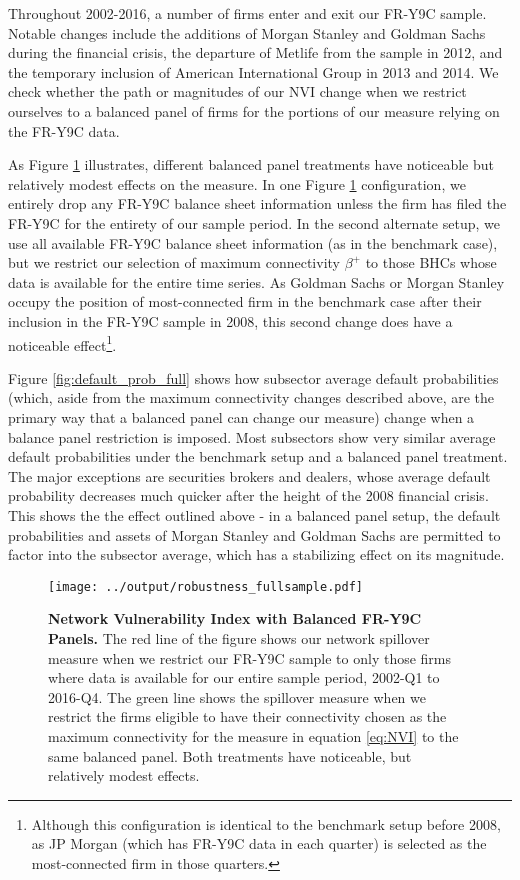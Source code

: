 Throughout 2002-2016, a number of firms enter and exit our FR-Y9C sample. Notable changes include the additions of Morgan Stanley and Goldman Sachs during the financial crisis, the departure of Metlife from the sample in 2012, and the temporary inclusion of American International Group in 2013 and 2014. We check whether the path or magnitudes of our NVI change when we restrict ourselves to a balanced panel of firms for the portions of our measure relying on the FR-Y9C data. 

As Figure \ref{fig:NVI_robust_full} illustrates, different balanced panel treatments have noticeable but relatively modest effects on the measure. In one Figure \ref{fig:NVI_robust_full} configuration, we entirely drop any FR-Y9C balance sheet information unless the firm has filed the FR-Y9C for the entirety of our sample period. In the second alternate setup, we use all available FR-Y9C balance sheet information (as in the benchmark case), but we restrict our selection of maximum connectivity $\beta^+$ to those BHCs whose data is available for the entire time series. As Goldman Sachs or Morgan Stanley occupy the position of most-connected firm in the benchmark case after their inclusion in the FR-Y9C sample in 2008, this second change does have a noticeable effect\footnote{Although this configuration is identical to the benchmark setup before 2008, as JP Morgan (which has FR-Y9C data in each quarter) is selected as the most-connected firm in those quarters.}.

Figure \ref{fig:default_prob_full} shows how subsector average default probabilities (which, aside from the maximum connectivity changes described above, are the primary way that a balanced panel can change our measure) change when a balance panel restriction is imposed. Most subsectors show very similar average default probabilities under the benchmark setup and a balanced panel treatment. The major exceptions are securities brokers and dealers, whose average default probability decreases much quicker after the height of the 2008 financial crisis. This shows the the effect outlined above - in a balanced panel setup, the default probabilities and assets of Morgan Stanley and Goldman Sachs are permitted to factor into the subsector average, which has a stabilizing effect on its magnitude. 

\begin{figure}[H]
\begin{center}
\texttt{[image: ../output/robustness\_fullsample.pdf]} 
\end{center}
\caption[]{\textbf{Network Vulnerability Index with Balanced FR-Y9C Panels.} The red line of the figure shows our network spillover measure when we restrict our FR-Y9C sample to only those firms where data is available for our entire sample period, 2002-Q1 to 2016-Q4. The green line shows the spillover measure when we restrict the firms eligible to have their connectivity chosen as the maximum connectivity for the measure in equation \ref{eq:NVI} to the same balanced panel. Both treatments have noticeable, but relatively modest effects.} \label{fig:NVI_robust_full}
\end{figure}

